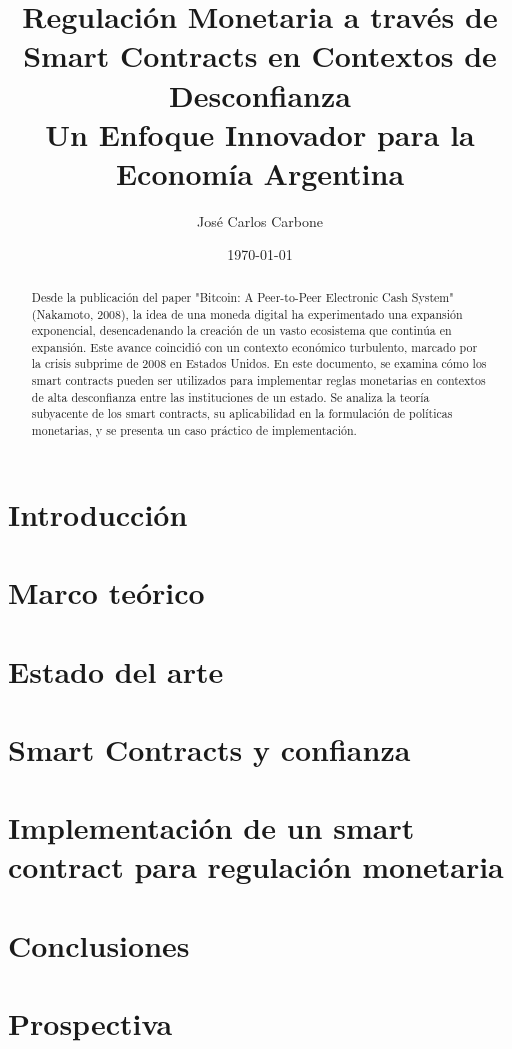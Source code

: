 \documentclass[12pt]{article}
\title{
    \vspace{2in} %
    \textbf{Regulación Monetaria a través de Smart Contracts en Contextos de Desconfianza} \\[1ex]
    \large Un Enfoque Innovador para la Economía Argentina \\[2ex]
}
\author{José Carlos Carbone}
\date{\today}
\begin{document}
\maketitle
\newpage %

\tableofcontents %
\newpage %

\begin{abstract}
    Desde la publicación del paper "Bitcoin: A Peer-to-Peer Electronic Cash System" (Nakamoto, 2008), 
    la idea de una moneda digital ha experimentado una expansión exponencial, 
    desencadenando la creación de un vasto ecosistema que continúa en expansión. 
    Este avance coincidió con un contexto económico turbulento, marcado por la crisis subprime de 2008 en Estados Unidos. 
    En este documento, se examina cómo los smart contracts pueden ser utilizados para implementar reglas monetarias 
    en contextos de alta desconfianza entre las instituciones de un estado. Se analiza la teoría subyacente de los 
    smart contracts, su aplicabilidad en la formulación de políticas monetarias, y se presenta un caso práctico de 
    implementación.
\end{abstract}

\section{Introducción} %

\section{Marco teórico}
\section{Estado del arte}
\section{Smart Contracts y confianza}
\section{Implementación de un smart contract para regulación monetaria}
\section{Conclusiones}
\section{Prospectiva}
\end{document}
